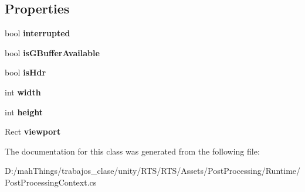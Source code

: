 \subsection*{Properties}
\begin{DoxyCompactItemize}
\item 
\mbox{\label{class_unity_engine_1_1_post_processing_1_1_post_processing_context_ab93ab5b37f664bd229c322164ca5bf70}} 
bool {\bfseries interrupted}
\item 
\mbox{\label{class_unity_engine_1_1_post_processing_1_1_post_processing_context_ac66f43731d1ae15bb7d0b1fb2884826e}} 
bool {\bfseries is\+G\+Buffer\+Available}
\item 
\mbox{\label{class_unity_engine_1_1_post_processing_1_1_post_processing_context_a4b5a681cde9e4aca82c23981d2130539}} 
bool {\bfseries is\+Hdr}
\item 
\mbox{\label{class_unity_engine_1_1_post_processing_1_1_post_processing_context_a6998d843d59216ccb88e6fd343fb7306}} 
int {\bfseries width}
\item 
\mbox{\label{class_unity_engine_1_1_post_processing_1_1_post_processing_context_ab1c293d501b4437e15c58d98b07c8b4b}} 
int {\bfseries height}
\item 
\mbox{\label{class_unity_engine_1_1_post_processing_1_1_post_processing_context_a8a1709dc0cdb5e5f7db01f7723f4baf3}} 
Rect {\bfseries viewport}
\end{DoxyCompactItemize}


The documentation for this class was generated from the following file\+:\begin{DoxyCompactItemize}
\item 
D\+:/mah\+Things/trabajos\+\_\+clase/unity/\+R\+T\+S/\+R\+T\+S/\+Assets/\+Post\+Processing/\+Runtime/Post\+Processing\+Context.\+cs\end{DoxyCompactItemize}
